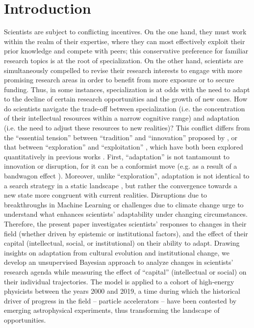 \documentclass{article}
\begin{document}

\section{Introduction}

Scientists are subject to conflicting incentives. On the one hand, they must work within the realm of their expertise, where they can most effectively exploit their prior knowledge and compete with peers; this conservative preference for familiar research topics is at the root of specialization. On the other hand, scientists are simultaneously compelled to revise their research interests to engage with more promising research areas in order to benefit from more exposure or to secure funding. Thus, in some instances, specialization is at odds with the need to adapt to the decline of certain research opportunities and the growth of new ones. How do scientists navigate the trade-off between specialization (i.e. the concentration of their intellectual resources within a narrow cognitive range) and adaptation (i.e. the need to adjust these resources to new realities)? This conflict differs from the ``essential tension'' between ``tradition'' and ``innovation'' proposed by \citet{Kuhn1997}, or that between ``exploration'' and ``exploitation'' \citep{March1991}, which have both been explored quantitatively in previous works \citep{Foster2015,Jia2017,Aleta2019,Zeng2019,Tripodi2020,Singh2024,liu2024science}%
. First, ``adaptation'' is not tantamount to innovation or disruption, for it can be a conformist move (e.g. as a result of a bandwagon effect \citep{Fujimura1988}). Moreover,  unlike ``exploration'', adaptation is not identical to a search strategy in a static landscape \citep{Galesic2023}, but rather the convergence towards a new state more congruent with current realities. Disruptions due to breakthroughs in Machine Learning or challenges due to climate change urge to understand what enhances scientists' adaptability under changing circumstances. Therefore, the present paper investigates scientists' responses to changes in their field (whether driven by epistemic or institutional factors), and the effect of their capital (intellectual, social, or institutional) on their ability to adapt. Drawing insights on adaptation from cultural evolution and institutional change, we develop an unsupervised Bayesian approach to analyze changes in scientists' research agenda while measuring the effect of ``capital'' (intellectual or social) on their individual trajectories. The model is applied to a cohort of high-energy physicists between the years 2000 and 2019, a time during which the historical driver of progress in the field -- particle accelerators -- have been contested by emerging astrophysical experiments, thus transforming the landscape of opportunities.
\end{document}
